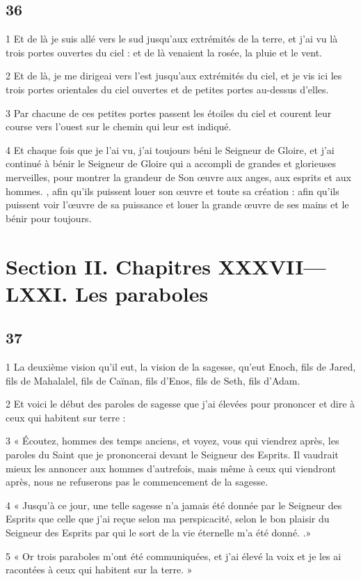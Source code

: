 \chapter{36}

\par 1 Et de là je suis allé vers le sud jusqu'aux extrémités de la terre, et j'ai vu là trois portes ouvertes du ciel : et de là venaient la rosée, la pluie et le vent.
\par 2 Et de là, je me dirigeai vers l'est jusqu'aux extrémités du ciel, et je vis ici les trois portes orientales du ciel ouvertes et de petites portes au-dessus d'elles.
\par 3 Par chacune de ces petites portes passent les étoiles du ciel et courent leur course vers l'ouest sur le chemin qui leur est indiqué.
\par 4 Et chaque fois que je l'ai vu, j'ai toujours béni le Seigneur de Gloire, et j'ai continué à bénir le Seigneur de Gloire qui a accompli de grandes et glorieuses merveilles, pour montrer la grandeur de Son œuvre aux anges, aux esprits et aux hommes. , afin qu'ils puissent louer son œuvre et toute sa création : afin qu'ils puissent voir l'œuvre de sa puissance et louer la grande œuvre de ses mains et le bénir pour toujours.

\part{Section II. Chapitres XXXVII—LXXI. Les paraboles}

\chapter{37}

\par 1 La deuxième vision qu'il eut, la vision de la sagesse, qu'eut Enoch, fils de Jared, fils de Mahalalel, fils de Caïnan, fils d'Enos, fils de Seth, fils d'Adam.
\par 2 Et voici le début des paroles de sagesse que j'ai élevées pour prononcer et dire à ceux qui habitent sur terre :
\par 3 « Écoutez, hommes des temps anciens, et voyez, vous qui viendrez après, les paroles du Saint que je prononcerai devant le Seigneur des Esprits. Il vaudrait mieux les annoncer aux hommes d'autrefois, mais même à ceux qui viendront après, nous ne refuserons pas le commencement de la sagesse.
\par 4 « Jusqu'à ce jour, une telle sagesse n'a jamais été donnée par le Seigneur des Esprits que celle que j'ai reçue selon ma perspicacité, selon le bon plaisir du Seigneur des Esprits par qui le sort de la vie éternelle m'a été donné. .»
\par 5 « Or trois paraboles m'ont été communiquées, et j'ai élevé la voix et je les ai racontées à ceux qui habitent sur la terre. »

